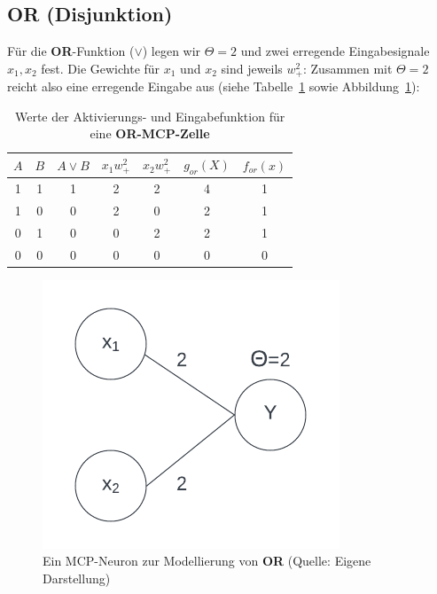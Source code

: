 {\subsection*{OR (Disjunktion)}

Für die \textbf{OR}-Funktion ($\lor$) legen wir $\Theta = 2$ und zwei erregende Eingabesignale $x_1, x_2$ fest.
Die Gewichte für $x_1$ und $x_2$ sind jeweils $w^2_+$: Zusammen mit $\Theta = 2$ reicht also eine erregende Eingabe aus (siehe Tabelle~\ref{tab:mcp-or} sowie Abbildung~\ref{fig:mcpor}):


\begin{table} %
    \centering
    \begin{tabular}{c | c | c |c | c | c|c}
 $A$ & $B$ & $A \lor B$ & $x_1w^2_+$ & $x_2w^2_+$ & $g_{or}(X)$ & $f_{or}(x)$ \\
\hline
 1   & 1   & 1          & 2     & 2     & 4           & 1            \\
 1   & 0   & 0          & 2     & 0     & 2           & 1            \\
 0   & 1   & 0          & 0     & 2     & 2           & 1            \\
 0   & 0   & 0          & 0     & 0     & 0           & 0            \\
\end{tabular}
\caption{Werte der Aktivierungs- und Eingabefunktion für eine \textbf{OR-MCP-Zelle}}
\label{tab:mcp-or}
\end{table}


\begin{figure}[h]
    \centering
    \includegraphics{chapters/3. Kuenstliche Neuronen/images/mcpor}
    \caption{Ein MCP-Neuron zur Modellierung von \textbf{OR} (Quelle: Eigene Darstellung)}
    \label{fig:mcpor}
\end{figure}


}
